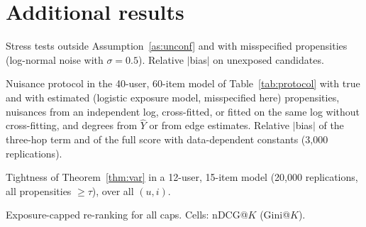 \section{Additional results}\label{app:more}

\begin{table}[h]\centering\small
\caption{Stress tests outside Assumption~\ref{as:unconf} and with misspecified
propensities (log-normal noise with $\sigma=0.5$). Relative $|$bias$|$ on unexposed
candidates.}\label{tab:stress}
\begin{adjustbox}{max width=\textwidth}

\end{adjustbox}
\end{table}

\begin{table}[h]\centering\small
\caption{Nuisance protocol in the 40-user, 60-item model of Table~\ref{tab:protocol}
with true and with estimated (logistic exposure model, misspecified here)
propensities, nuisances from an independent log, cross-fitted, or fitted on the
same log without cross-fitting, and degrees from $\hat Y$ or from edge
estimates. Relative $|$bias$|$ of the three-hop term and of the full score with
data-dependent constants (3{,}000 replications).}\label{tab:protocolfull}
\begin{adjustbox}{max width=\textwidth}

\end{adjustbox}
\end{table}

\begin{table}[h]\centering\small
\caption{Tightness of Theorem~\ref{thm:var} in a 12-user, 15-item model (20{,}000
replications, all propensities $\ge\tau$), over all $(u,i)$.}\label{tab:bounds}
\begin{adjustbox}{max width=\textwidth}\end{adjustbox}
\end{table}

\begin{table}[h]\centering\small
\caption{Exposure-capped re-ranking for all caps. Cells: nDCG@$K$ (Gini@$K$).}\label{tab:rerankfull}
\begin{adjustbox}{max width=\textwidth}\end{adjustbox}

\medskip
\begin{adjustbox}{max width=\textwidth}\end{adjustbox}

\medskip
\begin{adjustbox}{max width=\textwidth}\end{adjustbox}
\end{table}

